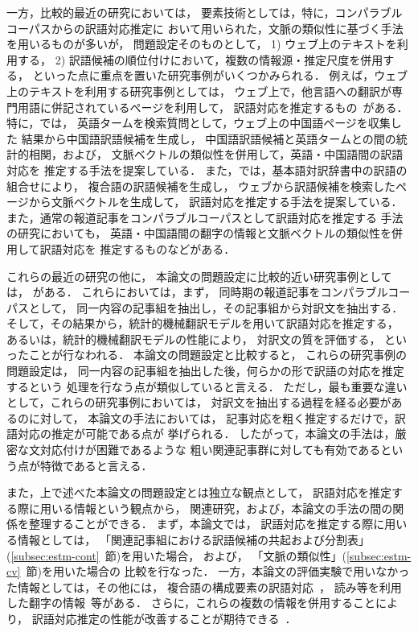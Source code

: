 一方，比較的最近の研究においては，
要素技術としては，特に，コンパラブルコーパスからの訳語対応推定に
おいて用いられた，文脈の類似性に基づく手法を用いるものが多いが，
問題設定そのものとして，
1) ウェブ上のテキストを利用する，
2) 訳語候補の順位付けにおいて，複数の情報源・推定尺度を併用する，
といった点に重点を置いた研究事例がいくつかみられる．
例えば，ウェブ上のテキストを利用する研究事例としては，
ウェブ上で，他言語への翻訳が専門用語に併記されているページを利用して，
訳語対応を推定するもの~\cite{Nagata01a,Cheng04a}がある．
特に，\cite{Cheng04a}では，
英語タームを検索質問として，ウェブ上の中国語ページを収集した
結果から中国語訳語候補を生成し，
中国語訳語候補と英語タームとの間の統計的相関，および，
文脈ベクトルの類似性を併用して，英語・中国語間の訳語対応を
推定する手法を提案している．
また，\cite{Cao02a}では，基本語対訳辞書中の訳語の組合せにより，
複合語の訳語候補を生成し，
ウェブから訳語候補を検索したページから文脈ベクトルを生成して，
訳語対応を推定する手法を提案している．
また，通常の報道記事をコンパラブルコーパスとして訳語対応を推定する
手法の研究においても，
英語・中国語間の翻字の情報と文脈ベクトルの類似性を併用して訳語対応を
推定するもの\cite{Shao04a,Huang04a}などがある．

これらの最近の研究の他に，
本論文の問題設定に比較的近い研究事例としては，
\cite{Fung04a,Munteanu04a}がある．
これらにおいては，まず，
同時期の報道記事をコンパラブルコーパスとして，
同一内容の記事組を抽出し，その記事組から対訳文を抽出する．
そして，その結果から，統計的機械翻訳モデルを用いて訳語対応を推定する\cite{Fung04a}，
あるいは，統計的機械翻訳モデルの性能により，
対訳文の質を評価する\cite{Munteanu04a}，
といったことが行なわれる．
本論文の問題設定と比較すると，
これらの研究事例の問題設定は，
同一内容の記事組を抽出した後，何らかの形で訳語の対応を推定するという
処理を行なう点が類似していると言える．
ただし，最も重要な違いとして，これらの研究事例においては，
対訳文を抽出する過程を経る必要があるのに対して，
本論文の手法においては，
記事対応を粗く推定するだけで，訳語対応の推定が可能である点が
挙げられる．
したがって，本論文の手法は，厳密な文対応付けが困難であるような
粗い関連記事群に対しても有効であるという点が特徴であると言える．

また，上で述べた本論文の問題設定とは独立な観点として，
訳語対応を推定する際に用いる情報という観点から，
関連研究，および，本論文の手法の間の関係を整理することができる．
まず，本論文では，
訳語対応を推定する際に用いる情報としては，
「関連記事組における訳語候補の共起および分割表」
(\ref{subsec:estm-cont}~節)を用いた場合，
および，
「文脈の類似性」(\ref{subsec:estm-cv}~節)を用いた場合の
比較を行なった．
一方，本論文の評価実験で用いなかった情報としては，その他には，
複合語の構成要素の訳語対応~\cite{Cao02a,Yoshimi04aj}，
読み等を利用した翻字の情報~\cite{Shao04a,Huang04a,Yoshimi04aj}等がある．
さらに，これらの複数の情報を併用することにより，
訳語対応推定の性能が改善することが期待できる~\cite{Hino04aj,Yoshimi04aj}．


